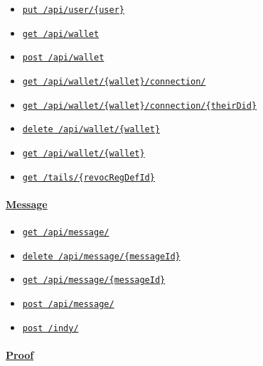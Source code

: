 \begin{itemize}
\item
  \protect\hyperlink{apiUserUserPut}{\texttt{put\ /api/user/\{user\}}}
\item
  \protect\hyperlink{apiWalletGet}{\texttt{get\ /api/wallet}}
\item
  \protect\hyperlink{apiWalletPost}{\texttt{post\ /api/wallet}}
\item
  \protect\hyperlink{apiWalletWalletConnectionGet}{\texttt{get\ /api/wallet/\{wallet\}/connection/}}
\item
  \protect\hyperlink{apiWalletWalletConnectionTheirDidGet}{\texttt{get\ /api/wallet/\{wallet\}/connection/\{theirDid\}}}
\item
  \protect\hyperlink{apiWalletWalletDelete}{\texttt{delete\ /api/wallet/\{wallet\}}}
\item
  \protect\hyperlink{apiWalletWalletGet}{\texttt{get\ /api/wallet/\{wallet\}}}
\item
  \protect\hyperlink{tailsRevocRegDefIdGet}{\texttt{get\ /tails/\{revocRegDefId\}}}
\end{itemize}

\hypertarget{message}{%
\paragraph{\texorpdfstring{\protect\hyperlink{Message}{Message}}{Message}}\label{message}}

\begin{itemize}
\tightlist
\item
  \protect\hyperlink{apiMessageGet}{\texttt{get\ /api/message/}}
\item
  \protect\hyperlink{apiMessageMessageIdDelete}{\texttt{delete\ /api/message/\{messageId\}}}
\item
  \protect\hyperlink{apiMessageMessageIdGet}{\texttt{get\ /api/message/\{messageId\}}}
\item
  \protect\hyperlink{apiMessagePost}{\texttt{post\ /api/message/}}
\item
  \protect\hyperlink{indyPost}{\texttt{post\ /indy/}}
\end{itemize}

\hypertarget{proof}{%
\paragraph{\texorpdfstring{\protect\hyperlink{Proof}{Proof}}{Proof}}\label{proof}}

